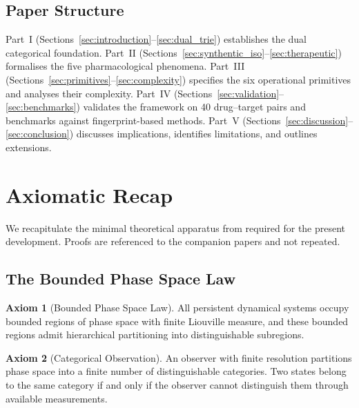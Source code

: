 \documentclass[11pt,twocolumn,a4paper]{article}
\theoremstyle{definition}
\newtheorem{axiom}{Axiom}
\theoremstyle{remark}
\begin{document}
\subsection{Paper Structure}

Part~I (Sections~\ref{sec:introduction}--\ref{sec:dual_trie}) establishes the dual categorical foundation. Part~II (Sections~\ref{sec:synthentic_iso}--\ref{sec:therapeutic}) formalises the five pharmacological phenomena. Part~III (Sections~\ref{sec:primitives}--\ref{sec:complexity}) specifies the six operational primitives and analyses their complexity. Part~IV (Sections~\ref{sec:validation}--\ref{sec:benchmarks}) validates the framework on 40 drug--target pairs and benchmarks against fingerprint-based methods. Part~V (Sections~\ref{sec:discussion}--\ref{sec:conclusion}) discusses implications, identifies limitations, and outlines extensions.

\section{Axiomatic Recap}
\label{sec:axioms}

We recapitulate the minimal theoretical apparatus from \citep{sachikonye2025a,sachikonye2025c,sachikonye2025d} required for the present development. Proofs are referenced to the companion papers and not repeated.

\subsection{The Bounded Phase Space Law}

\begin{axiom}[Bounded Phase Space Law]
\label{ax:bpsl}
All persistent dynamical systems occupy bounded regions of phase space with finite Liouville measure, and these bounded regions admit hierarchical partitioning into distinguishable subregions.
\end{axiom}

\begin{axiom}[Categorical Observation]
\label{ax:categorical}
An observer with finite resolution partitions phase space into a finite number of distinguishable categories. Two states belong to the same category if and only if the observer cannot distinguish them through available measurements.
\end{axiom}
\end{document}
